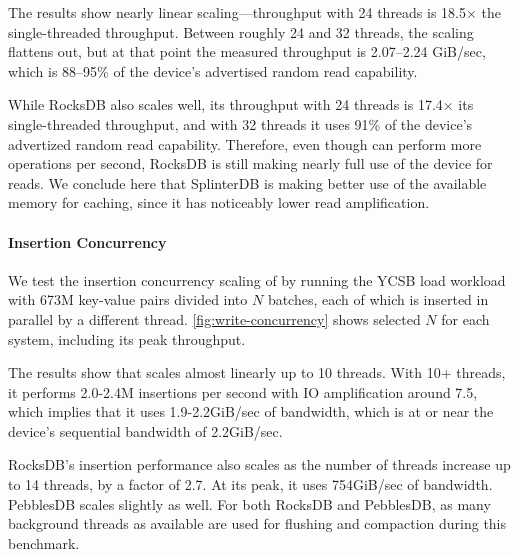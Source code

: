 The results show nearly linear scaling---throughput with 24 threads is
18.5$\times$ the single-threaded throughput. Between roughly 24 and 32 threads,
the scaling flattens out, but at that point the measured throughput is
2.07--2.24 GiB/sec, which is 88--95\% of the device's advertised random read
capability.

While RocksDB also scales well, its throughput with 24 threads is 17.4$\times$
its single-threaded throughput, and with 32 threads it uses 91\% of the
device's advertized random read capability. Therefore, even though \sysname can
perform more operations per second, RocksDB is still making nearly full use of
the device for reads. We conclude here that SplinterDB is making better use of
the available memory for caching, since it has noticeably lower read
amplification.


\paragraph{Insertion Concurrency}
We test the insertion concurrency scaling of \sysname by running the YCSB load
workload with 673M key-value pairs divided into $N$ batches, each of which
is inserted in parallel by a different thread. \cref{fig:write-concurrency}
shows selected $N$ for each system, including its peak throughput.

The results show that \sysname scales almost linearly up to 10 threads. With
10+ threads, it performs 2.0-2.4M insertions per second with IO amplification
around 7.5, which implies that it uses 1.9-2.2GiB/sec of bandwidth, which is at
or near the device's sequential bandwidth of 2.2GiB/sec.

RocksDB's insertion performance also scales as the number of threads increase
up to 14 threads, by a factor of 2.7. At its peak, it uses 754GiB/sec of
bandwidth. PebblesDB scales slightly as well.  For both RocksDB and PebblesDB,
as many background threads as available are used for flushing and compaction
during this benchmark.

